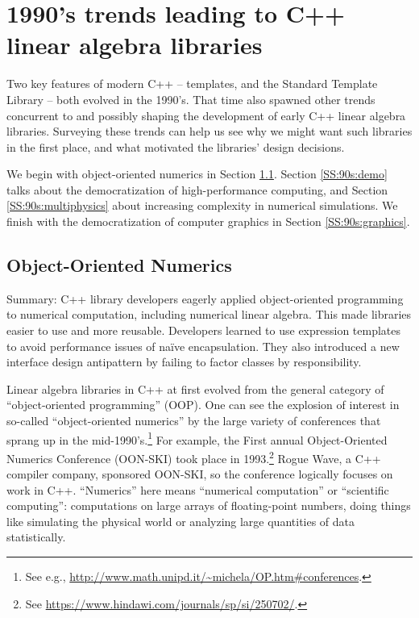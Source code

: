 \section{1990's trends leading to C++ linear algebra libraries}
\label{S:90s}

Two key features of modern C++ -- templates, and the Standard Template
Library -- both evolved in the 1990's.  That time also spawned other
trends concurrent to and possibly shaping the development of early C++
linear algebra libraries.  Surveying these trends can help us see why
we might want such libraries in the first place, and what motivated
the libraries' design decisions.  

We begin with object-oriented numerics in Section \ref{SS:90s:OON}.
Section \ref{SS:90s:demo} talks about the democratization of
high-performance computing, and Section \ref{SS:90s:multiphysics}
about increasing complexity in numerical simulations.  We finish with
the democratization of computer graphics in Section
\ref{SS:90s:graphics}.

\subsection{Object-Oriented Numerics}
\label{SS:90s:OON}

Summary: C++ library developers eagerly applied object-oriented
programming to numerical computation, including numerical linear
algebra.  This made libraries easier to use and more reusable.
Developers learned to use expression templates to avoid performance
issues of na\"ive encapsulation.  They also introduced a new interface
design antipattern by failing to factor classes by responsibility.

Linear algebra libraries in C++ at first evolved from the general
category of ``object-oriented programming'' (OOP).  One can see the
explosion of interest in so-called ``object-oriented numerics'' by the
large variety of conferences that sprang up in the
mid-1990's.\footnote{See e.g.,
  \url{http://www.math.unipd.it/~michela/OP.htm#conferences}.}  For
example, the First annual Object-Oriented Numerics Conference
(OON-SKI) took place in 1993.\footnote{See
  \url{https://www.hindawi.com/journals/sp/si/250702/}.} Rogue Wave, a
C++ compiler company, sponsored OON-SKI, so the conference logically
focuses on work in C++.  ``Numerics'' here means ``numerical
computation'' or ``scientific computing'': computations on large
arrays of floating-point numbers, doing things like simulating the
physical world or analyzing large quantities of data statistically.

